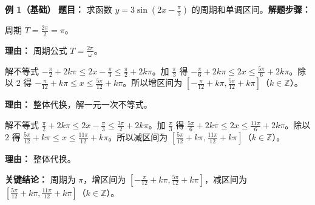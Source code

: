 \begin{examplebox}
	\textbf{\textcolor{CExample}{例 1（基础）}}
	\textbf{\textcolor{CExample}{题目：}} 求函数 $y=3\sin(2x-\frac{\pi}{3})$ 的周期和单调区间。\textbf{\textcolor{CExample}{解题步骤：}}
	\begin{description}[style=nextline, leftmargin=2.8em, labelsep=0.5em, itemsep=0.45em]
		\item[\textbf{第一步（识别周期）：}]
			周期 $T=\frac{2\pi}{2}=\pi$。
			\par\textbf{理由：} 周期公式 $T=\frac{2\pi}{\omega}$。
		\item[\textbf{第二步（求增区间）：}]
			解不等式 $-\frac{\pi}{2}+2k\pi \le 2x-\frac{\pi}{3} \le \frac{\pi}{2}+2k\pi$。加 $\frac{\pi}{3}$ 得 $-\frac{\pi}{6}+2k\pi \le 2x \le \frac{5\pi}{6}+2k\pi$。除以 $2$ 得 $-\frac{\pi}{12}+k\pi \le x \le \frac{5\pi}{12}+k\pi$。所以增区间为 $[-\frac{\pi}{12}+k\pi, \frac{5\pi}{12}+k\pi]$（$k\in\mathbb{Z}$）。
			\par\textbf{理由：} 整体代换，解一元一次不等式。
		\item[\textbf{第三步（求减区间）：}]
			解不等式 $\frac{\pi}{2}+2k\pi \le 2x-\frac{\pi}{3} \le \frac{3\pi}{2}+2k\pi$。加 $\frac{\pi}{3}$ 得 $\frac{5\pi}{6}+2k\pi \le 2x \le \frac{11\pi}{6}+2k\pi$。除以 $2$ 得 $\frac{5\pi}{12}+k\pi \le x \le \frac{11\pi}{12}+k\pi$。所以减区间为 $[\frac{5\pi}{12}+k\pi, \frac{11\pi}{12}+k\pi]$（$k\in\mathbb{Z}$）。
			\par\textbf{理由：} 整体代换。
	\end{description}
	\textbf{\textcolor{CExample}{关键结论：}}
	周期为 $\pi$，增区间为 $[-\frac{\pi}{12}+k\pi, \frac{5\pi}{12}+k\pi]$，减区间为 $[\frac{5\pi}{12}+k\pi, \frac{11\pi}{12}+k\pi]$（$k\in\mathbb{Z}$）。


\end{examplebox}
